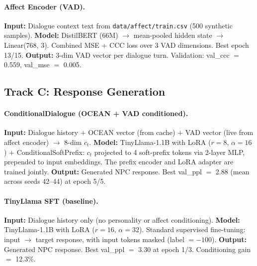 \documentclass[11pt]{article}
\begin{document}
\paragraph{Affect Encoder (VAD).}
\textbf{Input:} Dialogue context text from \texttt{data/affect/train.csv} (500 synthetic samples).
\textbf{Model:} DistilBERT (66M) $\rightarrow$ mean-pooled hidden state $\rightarrow$ Linear(768, 3).
Combined MSE $+$ CCC loss over 3 VAD dimensions.
Best epoch 13/15.
\textbf{Output:} 3-dim VAD vector per dialogue turn.
Validation: val\_ccc $=$ 0.559, val\_mse $=$ 0.005.

\subsection{Track C: Response Generation}

\paragraph{ConditionalDialogue (OCEAN + VAD conditioned).}
\textbf{Input:} Dialogue history $+$ OCEAN vector (from cache) $+$ VAD vector (live from affect encoder) $\rightarrow$ 8-dim $c_t$.
\textbf{Model:} TinyLlama-1.1B with LoRA ($r=8$, $\alpha=16$) $+$ ConditionalSoftPrefix: $c_t$ projected to 4 soft-prefix tokens via 2-layer MLP, prepended to input embeddings.
The prefix encoder and LoRA adapter are trained jointly.
\textbf{Output:} Generated NPC response.
Best val\_ppl $=$ 2.88 (mean across seeds 42--44) at epoch 5/5.

\paragraph{TinyLlama SFT (baseline).}
\textbf{Input:} Dialogue history only (no personality or affect conditioning).
\textbf{Model:} TinyLlama-1.1B with LoRA ($r=16$, $\alpha=32$). Standard supervised fine-tuning: input $\rightarrow$ target response, with input tokens masked (label $=-100$).
\textbf{Output:} Generated NPC response.
Best val\_ppl $=$ 3.30 at epoch 1/3.
Conditioning gain $=$ 12.3\%.
\end{document}
